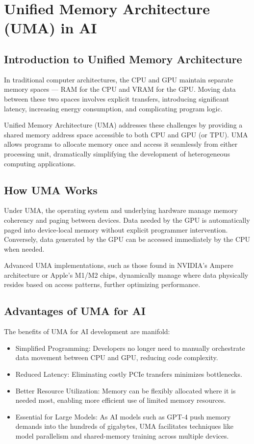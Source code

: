 \documentclass[openany]{book}
\begin{document}
\section{Unified Memory Architecture (UMA) in AI}

\subsection{Introduction to Unified Memory Architecture}
In traditional computer architectures, the CPU and GPU maintain separate memory 
spaces — RAM for the CPU and VRAM for the GPU. Moving data between these two 
spaces involves explicit transfers, introducing significant latency, increasing 
energy consumption, and complicating program logic.

Unified Memory Architecture (UMA) addresses these challenges by providing a 
shared memory address space accessible to both CPU and GPU (or TPU). UMA allows 
programs to allocate memory once and access it seamlessly from either processing 
unit, dramatically simplifying the development of heterogeneous computing 
applications.

\subsection{How UMA Works}
Under UMA, the operating system and underlying hardware manage memory coherency 
and paging between devices. Data needed by the GPU is automatically paged into 
device-local memory without explicit programmer intervention. Conversely, data 
generated by the GPU can be accessed immediately by the CPU when needed.

Advanced UMA implementations, such as those found in NVIDIA's Ampere 
architecture or Apple's M1/M2 chips, dynamically manage where data physically 
resides based on access patterns, further optimizing performance.

\subsection{Advantages of UMA for AI}
The benefits of UMA for AI development are manifold:

\begin{itemize}
    \item Simplified Programming: Developers no longer need to manually 
    orchestrate data movement between CPU and GPU, reducing code complexity.
    \item Reduced Latency: Eliminating costly PCIe transfers minimizes 
    bottlenecks.
    \item Better Resource Utilization: Memory can be flexibly allocated where it 
    is needed most, enabling more efficient use of limited memory resources.
    \item Essential for Large Models: As AI models such as GPT-4 push memory 
    demands into the hundreds of gigabytes, UMA facilitates techniques like 
    model parallelism and shared-memory training across multiple devices.
\end{itemize}
\end{document}
